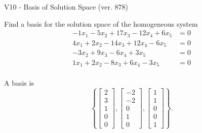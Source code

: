 \begin{exercise}
  \begin{exerciseTitle}V10 - Basis of Solution Space (ver. 878)\end{exerciseTitle}
  \begin{exerciseStatement}
    Find a basis for the solution space of the homogeneous system 
\begin{align*}
 -1 x_ 1 -5 x_ 2 + 17 x_ 3 -12 x_ 4 + 6 x_ 5 &= 0  \\ 
  4 x_ 1 + 2 x_ 2 -14 x_ 3 + 12 x_ 4 -6 x_ 5 &= 0  \\ 
  -3 x_ 2 + 9 x_ 3 -6 x_ 4 + 3 x_ 5 &= 0  \\ 
  1 x_ 1 + 2 x_ 2 -8 x_ 3 + 6 x_ 4 -3 x_ 5 &= 0  \\ 
 \end{align*}


 
  \end{exerciseStatement}

  \begin{exerciseAnswer}
   A basis is   
\[\left\{\left[\begin{array}{c}
2 \\
3 \\
1 \\
0 \\
0
\end{array}\right] , \left[\begin{array}{c}
-2 \\
-2 \\
0 \\
1 \\
0
\end{array}\right] , \left[\begin{array}{c}
1 \\
1 \\
0 \\
0 \\
1
\end{array}\right]\right\}.\]

  


  \end{exerciseAnswer}
\end{exercise}